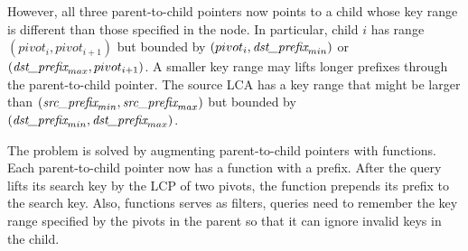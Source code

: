 However, all three parent-to-child pointers now points to a child whose key
range is different than those specified in the node.
In particular, child $i$ has range $(pivot_{i},pivot_{i+1})$ but bounded by
$(pivot_{i},\textit{dst\_prefix}_{min})$ or $(\textit{dst\_prefix}_{max}, pivot_{i+1})$.
A smaller key range may lifts longer prefixes through the parent-to-child
pointer.
The source LCA has a key range that might be larger than
$(\textit{src\_prefix}_{min}, \textit{src\_prefix}_{max})$ but bounded by $(\textit{dst\_prefix}_{min},\textit{dst\_prefix}_{max})$.

The problem is solved by augmenting parent-to-child pointers with \xf functions.
Each parent-to-child pointer now has a \xf function with a prefix.
After the query lifts its search key by the LCP of two pivots, the \xf function
prepends its prefix to the search key.
Also, \xf functions serves as filters, queries need to remember the key range
specified by the pivots in the parent so that it can ignore invalid keys in the
child.


